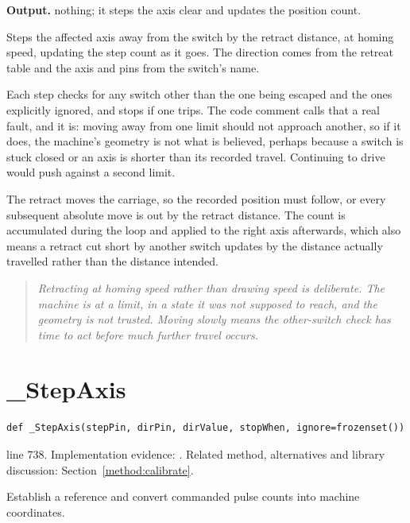 \noindent\textbf{Output.} nothing; it steps the axis clear and updates the position count.


Steps the affected axis away from the switch by the retract distance, at homing speed, updating the step count as it goes. The direction comes from the retreat table and the axis and pins from the switch's name.


Each step checks for any switch other than the one being escaped and the ones explicitly ignored, and stops if one trips. The code comment calls that a real fault, and it is: moving away from one limit should not approach another, so if it does, the machine's geometry is not what is believed, perhaps because a switch is stuck closed or an axis is shorter than its recorded travel. Continuing to drive would push against a second limit.


The retract moves the carriage, so the recorded position must follow, or every subsequent absolute move is out by the retract distance. The count is accumulated during the loop and applied to the right axis afterwards, which also means a retract cut short by another switch updates by the distance actually travelled rather than the distance intended.


\begin{quote}\small\itshape Retracting at homing speed rather than drawing speed is deliberate. The machine is at a limit, in a state it was not supposed to reach, and the geometry is not trusted. Moving slowly means the other-switch check has time to act before much further travel occurs.\end{quote}


\section{\_StepAxis}\label{fn:reproduce:-StepAxis}
\begin{lstlisting}[style=sig]
def _StepAxis(stepPin, dirPin, dirValue, stopWhen, ignore=frozenset())
\end{lstlisting}
 line 738. Implementation evidence: \cite{code2026}. Related method, alternatives and library discussion: Section~\ref{method:calibrate}.


Establish a reference and convert commanded pulse counts into machine coordinates.





